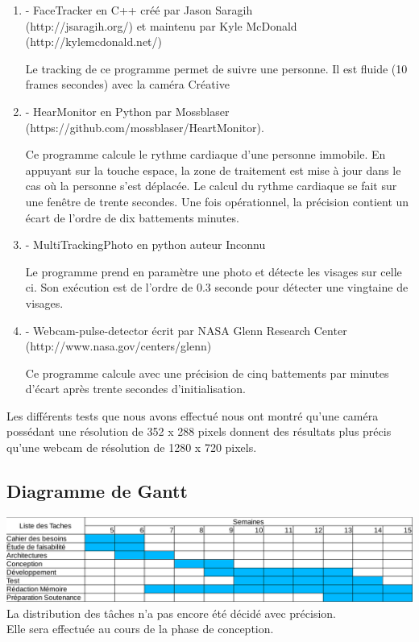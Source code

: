 \documentclass[12pt,a4paper]{article}
\begin{document}
\begin{enumerate}

\item[] - FaceTracker en C++ 
créé par Jason Saragih \\(http://jsaragih.org/) et maintenu par Kyle McDonald\\ (http://kylemcdonald.net/)

Le tracking de ce programme permet de suivre une personne. Il est fluide (10 frames secondes) avec la caméra Créative
\newline
\item[] - HearMonitor en Python par Mossblaser \\(https://github.com/mossblaser/HeartMonitor).


Ce programme calcule le rythme cardiaque d'une personne immobile. En appuyant sur la touche espace, la zone de traitement est mise à jour dans le cas où la personne s'est déplacée. Le calcul du rythme cardiaque se fait sur une fenêtre de trente secondes. 
Une fois opérationnel, la précision contient un écart de l'ordre de dix battements minutes.

\item[] - MultiTrackingPhoto en python auteur Inconnu 

Le programme prend en paramètre une photo et détecte les visages sur celle ci.
Son exécution est de l'ordre de 0.3 seconde pour détecter une vingtaine de visages.
\newline
 \item[] - Webcam-pulse-detector écrit par NASA Glenn Research Center \\(http://www.nasa.gov/centers/glenn)

Ce programme calcule avec une précision de cinq battements par minutes d'écart après trente secondes d'initialisation.

\end{enumerate}

Les différents tests que nous avons effectué nous ont montré qu'une caméra possédant une résolution de 352 x 288 pixels donnent des résultats plus précis qu'une webcam de résolution de 1280 x 720 pixels. 
\subsection{Diagramme de Gantt}
\includegraphics[scale=0.40]{Gantt.png}
La distribution des tâches n'a pas encore été décidé avec précision.\\ Elle sera effectuée au cours de la phase de conception.
\end{document}
